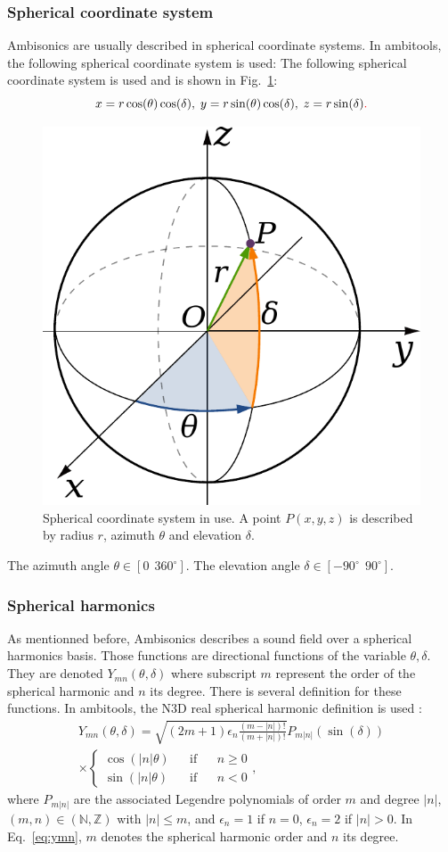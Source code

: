 \documentclass[10pt,a4paper]{article}
\begin{document}
\subsubsection{Spherical coordinate system}
Ambisonics are usually described in spherical coordinate systems. In ambitools, the following spherical coordinate system is used:
The following spherical coordinate system is used and is shown in Fig.~\ref{fig:coord_sph}:
\begin{equation}
x = r \cos(\theta) \cos(\delta), \; y = r \sin(\theta) \cos(\delta), \;
z = r \sin(\delta)\textcolor{red}{.}
\end{equation}
\begin{figure}[ht]
\centering
\includegraphics[height=0.3\columnwidth]{Fig_Coord_Sph.pdf}
\caption{Spherical coordinate system in use. A point $P (x,y,z)$ is described by radius $r$, azimuth $\theta$ and elevation $\delta$.}
\label{fig:coord_sph}
\end{figure}
The azimuth angle $\theta \in [0~~360^\circ]$. The elevation angle $\delta \in [-90^\circ~~90^\circ]$.

\subsubsection{Spherical harmonics}
As mentionned before, Ambisonics describes a sound field over a spherical harmonics basis. Those functions are directional functions of the variable $\theta,\delta$. They are denoted $Y_{mn}(\theta,\delta)$ where subscript $m$ represent the order of the spherical harmonic and $n$ its degree. There is several definition for these functions. In ambitools, the N3D real spherical harmonic definition is used \cite{daniel2000representation}:
\begin{multline}
Y_{mn}(\theta,\delta) = \sqrt{(2m+1)\epsilon_n \frac{(m-|n|)!}{(m+|n|)!}} P_{m|n|}(\sin(\delta)) \\
 \times \left\lbrace \begin{aligned} \cos(|n| \theta) & & \text{if} & & n \geq 0 \\ \sin(|n| \theta)  & & \text{if} & & n < 0  \end{aligned} \right.,
\label{eq:ymn}
\end{multline}
where $P_{m|n|}$ are the associated Legendre polynomials of order $m$ and degree $|n|$, $(m,n) \in (\mathbb{N},\mathbb{Z})$ with $|n| \leq m$, and $\epsilon_n = 1$ if $n = 0$, $\epsilon_n = 2$ if $|n| > 0$. In Eq.~\eqref{eq:ymn}, $m$ denotes the spherical harmonic order and $n$ its degree.
\end{document}
